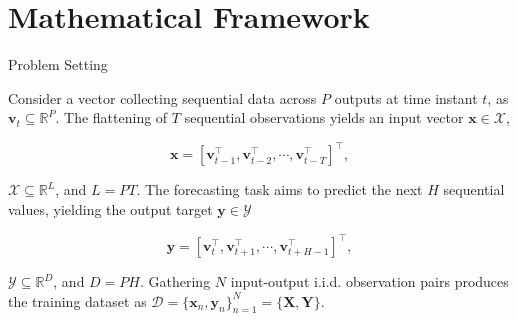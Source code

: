 \section{Mathematical Framework}

\begin{frame}{Problem Setting}

\begin{block}{}
	Consider a vector collecting sequential data across $P$ outputs at time instant \( t \), as \( \boldsymbol{v}_t \subseteq \mathbb{R}^{P}\). The flattening of \( T \) sequential observations yields an input vector \( \boldsymbol{x} \in \mathcal{X} \),
\end{block}

\[ 
\boldsymbol{x}= [ \boldsymbol{v}_{t-1}^\top, \boldsymbol{v}_{t-2}^\top, \cdots, \boldsymbol{v}_{t-T}^\top  ]^\top,
\]

\begin{block}{}
	\( {\mathcal{X}} \subseteq \mathbb{R}^{L} \), and \( L = PT \). The forecasting task aims to predict the next \(H\) sequential values, yielding the output target \( \boldsymbol{y} \in {\mathcal{Y}} \)
\end{block}

\[
\boldsymbol{y} = [ \boldsymbol{v}_{t}^\top, \boldsymbol{v}_{t+1}^\top, \cdots, \boldsymbol{v}_{t+H-1}^\top  ]^\top,
\] 

\begin{block}{}
	\( {\mathcal{Y}} \subseteq \mathbb{R}^{D} \), and \( D = PH \). Gathering \( N \) input-output i.i.d. observation pairs produces the training dataset as \( {\mathcal{D}} = \{\boldsymbol{x}_n, \boldsymbol{y}_n\}_{n=1}^N = \{ \boldsymbol{X}, \boldsymbol{Y}\} \).
\end{block}

\end{frame}

